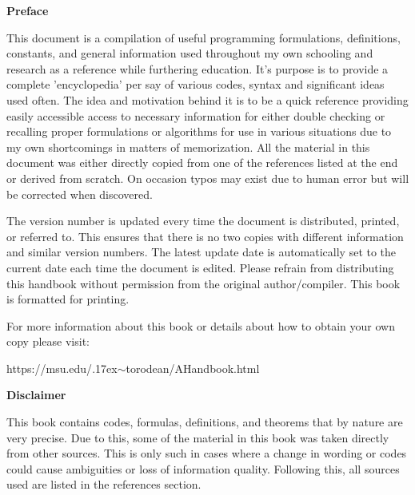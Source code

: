 \begin{center}
	\textbf{Preface}
\end{center}

This document is a compilation of useful programming formulations, definitions, constants, and general information used throughout my own schooling and research as a reference while furthering education. It's purpose is to provide a complete 'encyclopedia' per say of various codes, syntax and significant ideas used often. The idea and motivation behind it is to be a quick reference providing easily accessible access to necessary information for either double checking or recalling proper formulations or algorithms for use in various situations due to my own shortcomings in matters of memorization. All the material in this document was either directly copied from one of the references listed at the end or derived from scratch. On occasion typos may exist due to human error but will be corrected when discovered.
	
The version number is updated every time the document is distributed, printed, or referred to. This ensures that there is no two copies with different information and similar version numbers. The latest update date is automatically set to the current date each time the document is edited. Please refrain from distributing this handbook without permission from the original author/compiler. This book is formatted for printing.

For more information about this book or details about how to obtain your own copy please visit:
\begin{center}
	https://msu.edu/{\raise.17ex\hbox{$\scriptstyle\sim$}}torodean/AHandbook.html
\end{center}
\begin{center}
	\textbf{Disclaimer}
\end{center}

This book contains codes, formulas, definitions, and theorems that by nature are very precise. Due to this, some of the material in this book was taken directly from other sources. This is only such in cases where a change in wording or codes could cause ambiguities or loss of information quality.  Following this, all sources used are listed in the references section.